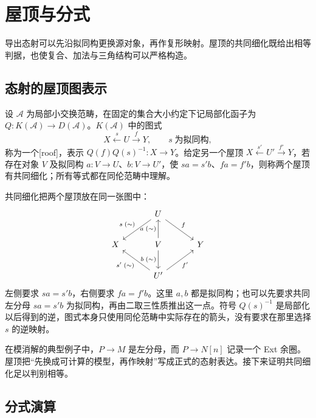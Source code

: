 
\section{屋顶与分式}
\label{b4:sec:1702}

导出态射可以先沿拟同构更换源对象，再作复形映射。屋顶的共同细化既给出相等判据，也使复合、加法与三角结构可以严格构造。


%
%

\subsection{态射的屋顶图表示}
\label{b4:subsec:1702:01}

\begin{definition}\label{b4:def:derived-roof}
	设 \(\mathcal A\) 为局部小交换范畴，在固定的集合大小约定下记局部化函子为 \(Q:K(\mathcal A)\to D(\mathcal A)\)。\(K(\mathcal A)\) 中的图式
	\[
		X\xleftarrow{s}U\xrightarrow{f}Y,\qquad s\;\text{为拟同构},
	\]
	称为一个[roof]，表示 \(Q(f)Q(s)^{-1}:X\to Y\)。给定另一个屋顶 \(X\xleftarrow{s'}U'\xrightarrow{f'}Y\)，若存在对象 \(V\) 及拟同构 \(a:V\to U\)、\(b:V\to U'\)，使 \(sa=s'b\)、\(fa=f'b\)，则称两个屋顶有共同细化；所有等式都在同伦范畴中理解。
\end{definition}

共同细化把两个屋顶放在同一张图中：
\[
	\begin{tikzcd}[column sep=3.2em,row sep=2.2em]
		&U\arrow[dl,"s\;(\sim)"']\arrow[dr,"f"]&\\
		X&V\arrow[u,"a\;(\sim)"]\arrow[d,"b\;(\sim)"']&Y\\
		&U'\arrow[ul,"s'\;(\sim)"]\arrow[ur,"f'"']&
	\end{tikzcd}
\]
左侧要求 \(sa=s'b\)，右侧要求 \(fa=f'b\)。这里 \(a,b\) 都是拟同构；也可以先要求共同左分母 \(sa=s'b\) 为拟同构，再由二取三性质推出这一点。符号 \(Q(s)^{-1}\) 是局部化以后得到的逆，图式本身只使用同伦范畴中实际存在的箭头，没有要求在那里选择 \(s\) 的逆映射。

\ProseParagraphBreak
在模消解的典型例子中，\(P\to M\) 是左分母，而 \(P\to N[n]\) 记录一个 Ext 余圈。屋顶把“先换成可计算的模型，再作映射”写成正式的态射表达。接下来证明共同细化足以判别相等。

\subsection{分式演算}
\label{b4:subsec:1702:02}

